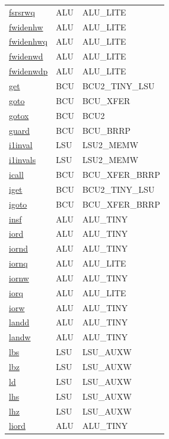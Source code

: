 \begin{small}
\begin{longtable}[l]{l l l}
\hyperlink{lvx.fsrsrwq}{fsrsrwq} & ALU & ALU\_LITE \\ 
\hyperlink{lvx.fwidenhw}{fwidenhw} & ALU & ALU\_LITE \\ 
\hyperlink{lvx.fwidenhwq}{fwidenhwq} & ALU & ALU\_LITE \\ 
\hyperlink{lvx.fwidenwd}{fwidenwd} & ALU & ALU\_LITE \\ 
\hyperlink{lvx.fwidenwdp}{fwidenwdp} & ALU & ALU\_LITE \\ 
\hyperlink{lvx.get}{get} & BCU & BCU2\_TINY\_LSU \\ 
\hyperlink{lvx.goto}{goto} & BCU & BCU\_XFER \\ 
\hyperlink{lvx.gotox}{gotox} & BCU & BCU2 \\ 
\hyperlink{lvx.guard}{guard} & BCU & BCU\_BRRP \\ 
\hyperlink{lvx.i1inval}{i1inval} & LSU & LSU2\_MEMW \\ 
\hyperlink{lvx.i1invals}{i1invals} & LSU & LSU2\_MEMW \\ 
\hyperlink{lvx.icall}{icall} & BCU & BCU\_XFER\_BRRP \\ 
\hyperlink{lvx.iget}{iget} & BCU & BCU2\_TINY\_LSU \\ 
\hyperlink{lvx.igoto}{igoto} & BCU & BCU\_XFER\_BRRP \\ 
\hyperlink{lvx.insf}{insf} & ALU & ALU\_TINY \\ 
\hyperlink{lvx.iord}{iord} & ALU & ALU\_TINY \\ 
\hyperlink{lvx.iornd}{iornd} & ALU & ALU\_TINY \\ 
\hyperlink{lvx.iornq}{iornq} & ALU & ALU\_LITE \\ 
\hyperlink{lvx.iornw}{iornw} & ALU & ALU\_TINY \\ 
\hyperlink{lvx.iorq}{iorq} & ALU & ALU\_LITE \\ 
\hyperlink{lvx.iorw}{iorw} & ALU & ALU\_TINY \\ 
\hyperlink{lvx.landd}{landd} & ALU & ALU\_TINY \\ 
\hyperlink{lvx.landw}{landw} & ALU & ALU\_TINY \\ 
\hyperlink{lvx.lbs}{lbs} & LSU & LSU\_AUXW \\ 
\hyperlink{lvx.lbz}{lbz} & LSU & LSU\_AUXW \\ 
\hyperlink{lvx.ld}{ld} & LSU & LSU\_AUXW \\ 
\hyperlink{lvx.lhs}{lhs} & LSU & LSU\_AUXW \\ 
\hyperlink{lvx.lhz}{lhz} & LSU & LSU\_AUXW \\ 
\hyperlink{lvx.liord}{liord} & ALU & ALU\_TINY \\ 

\end{longtable}
\end{small}
